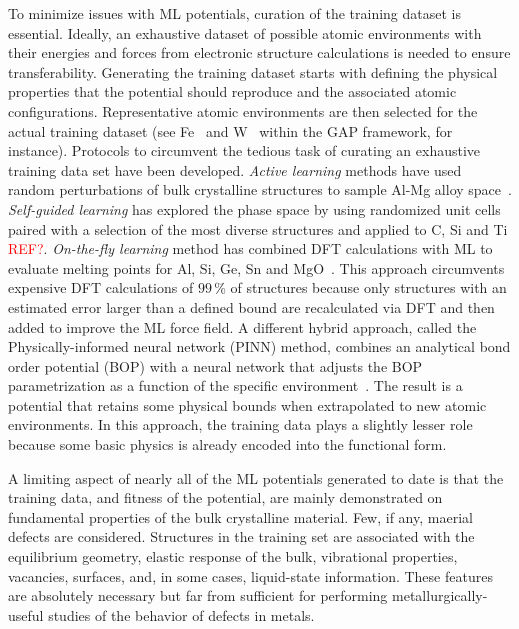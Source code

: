 \documentclass{article}
\begin{document}
To minimize issues with ML potentials, curation of the training dataset is essential.
Ideally, an exhaustive dataset of possible atomic environments with their energies and forces from electronic structure calculations is needed to ensure transferability.
Generating the training dataset starts with defining the physical properties that the potential should reproduce and the associated atomic configurations. Representative atomic environments are then selected for the actual training dataset (see Fe~\cite{Dragoni2018AchievingIron} and W~\cite{Szlachta2014AccuracyTungsten} within the GAP framework, for instance).
Protocols to circumvent the tedious task of curating an exhaustive training data set have been developed.  \textit{Active learning} methods have used random perturbations of bulk crystalline structures to sample Al-Mg alloy space~\cite{Zhang2019ActiveSimulation}.  \textit{Self-guided learning} has explored the phase space by using randomized unit cells paired with a selection of the most diverse structures and applied to C, Si and Ti \textcolor{red}{REF?}.
\textit{On-the-fly learning} method has combined DFT calculations with ML to evaluate melting points for Al, Si, Ge, Sn and MgO~\cite{Jinnouchi2019On-the-flyPointsb}.
This approach circumvents expensive DFT calculations of $99\,$\% of structures because only structures with an estimated error larger than a defined bound are recalculated via DFT and then added to improve the ML force field.  A different hybrid approach, called the Physically-informed neural network (PINN) method, combines an analytical bond order potential (BOP) with a neural network that adjusts the BOP parametrization as a function of the specific environment~\cite{PurjaPun0PhysicallyMaterials}.  The result is a potential that retains some physical bounds when extrapolated to new atomic environments.
In this approach, the training data plays a slightly lesser role because some basic physics is already encoded into the functional form.

A limiting aspect of nearly all of the ML potentials generated to date is that the training data, and fitness of the potential, are mainly demonstrated on fundamental properties of the bulk crystalline material.  Few, if any, maerial defects are considered.
Structures in the training set are associated with the equilibrium geometry, elastic response of the bulk, vibrational properties, vacancies, surfaces, and, in some cases, liquid-state information.
These features are absolutely necessary but far from sufficient for performing metallurgically-useful studies of the behavior of defects in metals.
\end{document}
